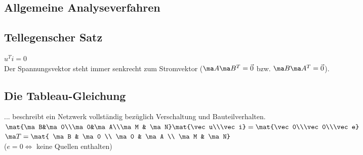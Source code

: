 \documentclass[fs, footer]{latex4ei}
\begin{document}
\begin{multicols*}{4}
    \section{Allgemeine Analyseverfahren}

    \subsection{Tellegenscher Satz}
    $u^Ti = 0$\\
    Der Spannungsvektor steht immer senkrecht zum Stromvektor ($\ma A\ma B^T = \vec 0$ bzw. $\ma B\ma A^T = \vec 0$).

    \subsection{Die Tableau-Gleichung}
    ... beschreibt ein Netzwerk vollständig bezüglich Verschaltung und Bauteilverhalten.\\
    $\mat{\ma B&\ma 0\\\ma 0&\ma A\\\ma M & \ma N}\mat{\vec u\\\vec i} = \mat{\vec 0\\\vec 0\\\vec e}$\qquad
    $\ma T = \mat{ \ma B & \ma 0 \\ \ma 0 & \ma A \\ \ma M & \ma N}$\\
    ($e = 0 \Leftrightarrow$ keine Quellen enthalten)


\end{multicols*}
\end{document}
